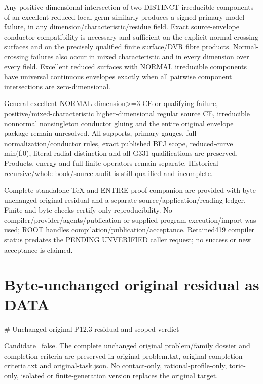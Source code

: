 \documentclass[11pt]{article}
\begin{document}
Any positive-dimensional intersection of two DISTINCT irreducible components of an excellent reduced local germ similarly produces a signed primary-model failure, in any dimension/characteristic/residue field. Exact source-envelope conductor compatibility is necessary and sufficient on the explicit normal-crossing surfaces and on the precisely qualified finite surface/DVR fibre products. Normal-crossing failures also occur in mixed characteristic and in every dimension over every field. Excellent reduced surfaces with NORMAL irreducible components have universal continuous envelopes exactly when all pairwise component intersections are zero-dimensional.

General excellent NORMAL dimension\textgreater{}=3 CE or qualifying failure, positive/mixed-characteristic higher-dimensional regular source CE, irreducible nonnormal nonsingleton conductor gluing and the entire original envelope package remain unresolved. All supports, primary gauges, full normalization/conductor rules, exact published BFJ scope, reduced-curve min(f,0), literal radial distinction and all G331 qualifications are preserved. Products, energy and full finite operators remain separate. Historical recursive/whole-book/source audit is still qualified and incomplete.

Complete standalone TeX and ENTIRE proof companion are provided with byte-unchanged original residual and a separate source/application/reading ledger. Finite and byte checks certify only reproducibility. No compiler/provider/agents/publication or supplied-program execution/import was used; ROOT handles compilation/publication/acceptance. Retained419 compiler status predates the PENDING UNVERIFIED caller request; no success or new acceptance is claimed.

\section*{Byte-unchanged original residual as DATA}
\# Unchanged original P12.3 residual and scoped verdict

Candidate=false. The complete unchanged original problem/family dossier and completion criteria are preserved in original-problem.txt, original-completion-criteria.txt and original-task.json. No contact-only, rational-profile-only, toric-only, isolated or finite-generation version replaces the original target.
\end{document}
